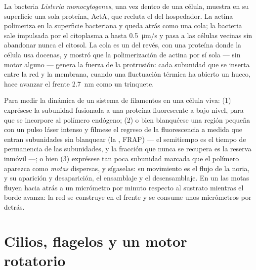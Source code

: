 \begin{example}\label{ex:b3:cytoskeleton-motility:listeria}
La bacteria \emph{Listeria monocytogenes}, una vez dentro de una célula,
muestra en su superficie una sola proteína, ActA, que recluta el  del hospedador. La actina polimeriza en la superficie bacteriana y
queda atrás como una cola; la bacteria sale impulsada por el citoplasma a
hasta \qty{0.5}{\micro m/s} y pasa a las células vecinas sin abandonar
nunca el citosol. La cola es un  del revés, con una proteína
donde la célula usa docenas, y mostró que la polimerización de actina por
sí sola --- sin motor alguno --- genera la fuerza de la protrusión: cada
subunidad que se inserta entre la red y la membrana, cuando una
fluctuación térmica ha abierto un hueco, hace avanzar el frente
\qty{2.7}{nm} como un trinquete.
\end{example}

\begin{method}\label{met:b3:cytoskeleton-motility:frap}
Para medir la dinámica de un sistema de filamentos en una célula viva:
(1) exprésese la subunidad fusionada a una proteína fluorescente a bajo
nivel, para que se incorpore al polímero endógeno; (2) o bien blanquéese
una región pequeña con un pulso láser intenso y fílmese el regreso de la
fluorescencia a medida que entran subunidades sin blanquear (la
\emph{}, FRAP) --- el
semitiempo es el tiempo de permanencia de las subunidades, y la fracción
que nunca se recupera es la reserva inmóvil ---; o bien (3) exprésese tan
poca subunidad marcada que el polímero aparezca como \emph{motas}
dispersas, y sígaselas: su movimiento es el flujo de la noria, y su
aparición y desaparición, el ensamblaje y el desensamblaje. En un
 las motas fluyen hacia atrás a un micrómetro por minuto
respecto al sustrato mientras el borde avanza: la red se construye en el
frente y se consume unos micrómetros por detrás.
\end{method}

\section{Cilios, flagelos y un motor rotatorio}

